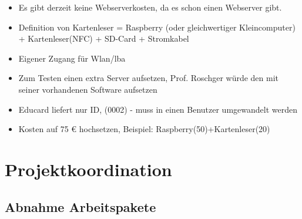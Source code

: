 {\begin{itemize}
            \item Es gibt derzeit keine Webserverkosten, da es schon einen Webserver gibt.
            \item Definition von Kartenleser = Raspberry (oder gleichwertiger Kleincomputer) + Kartenleser(NFC) + SD-Card + Stromkabel
            \item Eigener Zugang für Wlan/\gls{lba}
            \item Zum Testen einen extra Server aufsetzen, Prof. Roschger würde den mit seiner vorhandenen Software aufsetzen
            \item Educard liefert nur ID, (0002) - muss in einen Benutzer umgewandelt werden
            \item Kosten auf 75 € hochsetzen, Beispiel: Raspberry(50)+Kartenleser(20)
            \vspace{0.2cm}
        \end{itemize}
}
\newpage
\newpage


\section{Projektkoordination}

\subsection{Abnahme Arbeitspakete}

